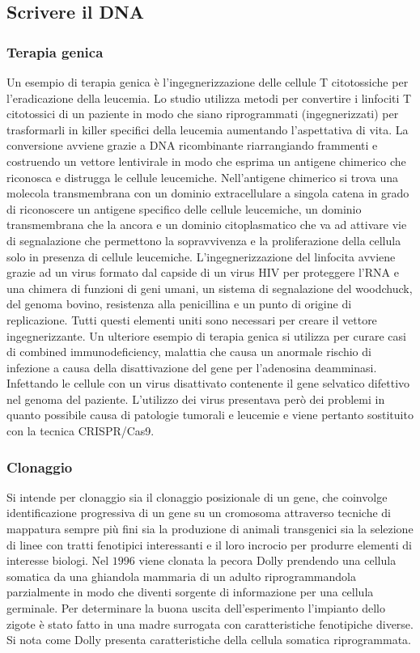 	\subsection{Scrivere il DNA}

		\subsubsection{Terapia genica}
		Un esempio di terapia genica \`e l'ingegnerizzazione delle cellule T citotossiche per l'eradicazione della leucemia. 
		Lo studio utilizza metodi per convertire i linfociti T citotossici di un paziente in modo che siano riprogrammati (ingegnerizzati) per trasformarli in killer specifici della leucemia aumentando l'aspettativa di vita. 
		La conversione avviene grazie a DNA ricombinante riarrangiando frammenti e costruendo un vettore lentivirale in modo che esprima un antigene chimerico che riconosca e distrugga le cellule leucemiche. 
		Nell'antigene chimerico si trova una molecola transmembrana con un dominio extracellulare a singola catena in grado di riconoscere un antigene specifico delle cellule leucemiche, un dominio transmembrana che la ancora e un dominio citoplasmatico che va ad attivare vie di segnalazione che permettono la sopravvivenza e la proliferazione della cellula solo in presenza di cellule leucemiche. 
		L'ingegnerizzazione del linfocita avviene grazie ad un virus formato dal capside di un virus HIV per proteggere l'RNA e una chimera di funzioni di geni umani, un sistema di segnalazione del woodchuck, del genoma bovino, resistenza alla penicillina e un punto di origine di replicazione. 
		Tutti questi elementi uniti sono necessari per creare il vettore ingegnerizzante. 
		Un ulteriore esempio di terapia genica si utilizza per curare casi di combined immunodeficiency, malattia che causa un anormale rischio di infezione a causa della disattivazione del gene per l'adenosina deamminasi. 
		Infettando le cellule con un virus disattivato contenente il gene selvatico difettivo nel genoma del paziente. 
		L'utilizzo dei virus presentava per\`o dei problemi in quanto possibile causa di patologie tumorali e leucemie e viene pertanto sostituito con la tecnica CRISPR/Cas9.

		\subsubsection{Clonaggio}
		Si intende per clonaggio sia il clonaggio posizionale di un gene, che coinvolge identificazione progressiva di un gene su un cromosoma attraverso tecniche di mappatura sempre pi\`u fini sia la produzione di animali transgenici sia la selezione di linee con tratti fenotipici interessanti e il loro incrocio per produrre elementi di interesse biologi. 
		Nel $1996$ viene clonata la pecora Dolly prendendo una cellula somatica da una ghiandola mammaria di un adulto riprogrammandola parzialmente in modo che diventi sorgente di informazione per una cellula
		germinale. 
		Per determinare la buona uscita dell'esperimento l'impianto dello zigote \`e stato fatto in una madre surrogata con caratteristiche fenotipiche diverse. 
		Si nota come Dolly presenta caratteristiche della cellula somatica riprogrammata. 

